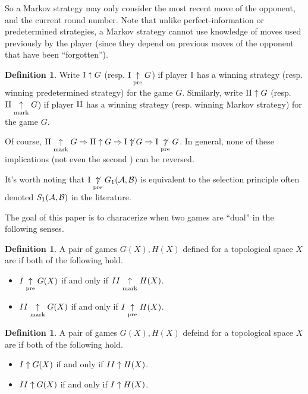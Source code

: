 \documentclass{amsart}
\theoremstyle{plain}
\theoremstyle{definition}
\newtheorem{definition}[theorem]{Definition}
\theoremstyle{remark}
\theoremstyle{plain}
\theoremstyle{definition}
\theoremstyle{remark}
\begin{document}
So a Markov strategy may only consider the most recent move of the opponent,
and the current round number. Note that unlike perfect-information or
predetermined strategies, a Markov strategy cannot use knowledge of
moves used previously by the player (since they depend on previous moves of
the opponent that have been ``forgotten'').

\begin{definition}
  Write \(\mathrm{I}\uparrow G\) (resp. \(\mathrm{I}\underset{\text{pre}}{\uparrow} G\)) if player \(\mathrm{I}\) has a winning
  strategy (resp. winning predetermined strategy) for the game \(G\). Similarly,
  write \(\mathrm{II}\uparrow G\) (resp. \(\mathrm{II}\underset{\text{mark}}{\uparrow} G\)) if player \(\mathrm{II}\) has a winning
  strategy (resp. winning Markov strategy) for the game \(G\).
\end{definition}

Of course, \(\mathrm{II}\underset{\text{mark}}{\uparrow} G\Rightarrow \mathrm{II}\uparrow G\Rightarrow \mathrm{I}\not\uparrow G\Rightarrow \mathrm{I}\underset{\text{pre}}{\not\uparrow} G\).
In general, none of these implications (not even the second \cite{MR0054922}) can be reversed.

It's worth noting that \(\mathrm{I}\underset{\text{pre}}{\not\uparrow} G_{1}(\mathcal{A},\mathcal{B})\) is equivalent
to the selection principle often denoted \(S_{1}(\mathcal{A},\mathcal{B})\) in the literature.

The goal of this paper is to characerize when two games are ``dual'' in the following
senses.

\begin{definition}
  A pair of games \(G(X),H(X)\) defined for a topological space \(X\)
  are  if both
  of the following hold.
  \begin{itemize}
    \item \(I\underset{\text{pre}}{\uparrow} G(X)\) if and only if \(II\underset{\text{mark}}{\uparrow} H(X)\).
    \item \(II\underset{\text{mark}}{\uparrow} G(X)\) if and only if \(I\underset{\text{pre}}{\uparrow} H(X)\).
  \end{itemize}
\end{definition}

\begin{definition}
  A pair of games \(G(X),H(X)\) defeind for a topological space \(X\)
  are  if both
  of the following hold.
  \begin{itemize}
    \item \(I\uparrow G(X)\) if and only if \(II\uparrow H(X)\).
    \item \(II\uparrow G(X)\) if and only if \(I\uparrow H(X)\).
  \end{itemize}
\end{definition}
\end{document}

